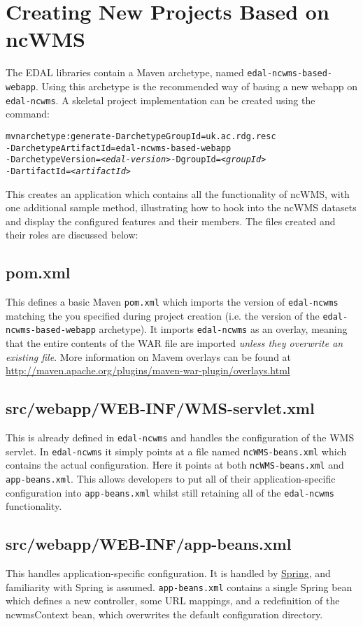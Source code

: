 \documentclass[a4paper]{article}
\begin{document}
\section{Creating New Projects Based on ncWMS}
The EDAL libraries contain a Maven archetype, named
{\tt edal-ncwms-based-webapp}.  Using this archetype is the recommended
way of basing a new webapp on {\tt edal-ncwms}.  A skeletal project
implementation can be created using the command:
\begin{alltt}
mvn archetype:generate -DarchetypeGroupId=uk.ac.rdg.resc
-DarchetypeArtifactId=edal-ncwms-based-webapp
-DarchetypeVersion=\emph{<edal-version>} -DgroupId=\emph{<groupId>}
-DartifactId=\emph{<artifactId>}
\end{alltt}
This creates an application which contains all the functionality of ncWMS, with
one additional sample method, illustrating how to hook into the ncWMS datasets
and display the configured features and their members.  The files created and
their roles are discussed below:

\subsection{pom.xml}
This defines a basic Maven {\tt pom.xml} which imports the
version of {\tt edal-ncwms} matching the {\tt <edal-version>} you specified
during project creation (i.e. the version of the {\tt edal-ncwms-based-webapp}
archetype).  It imports {\tt edal-ncwms} as an overlay, meaning that the entire
contents of the WAR file are imported \emph{unless they overwrite an existing
file}.  More information on Mavem overlays can be found at
\url{http://maven.apache.org/plugins/maven-war-plugin/overlays.html}
  
\subsection{src/webapp/WEB-INF/WMS-servlet.xml}
This is already defined in {\tt edal-ncwms} and handles the configuration of
the WMS servlet.  In {\tt edal-ncwms} it simply points at a file named
{\tt ncWMS-beans.xml} which contains the actual configuration.  Here it points
at both {\tt ncWMS-beans.xml} and {\tt app-beans.xml}.  This allows developers
to put all of their application-specific configuration into {\tt app-beans.xml}
whilst still retaining all of the {\tt edal-ncwms} functionality.

\subsection{src/webapp/WEB-INF/app-beans.xml}
This handles application-specific configuration.  It is handled by
\href{http://www.springsource.org/}{Spring}, and familiarity with Spring is
assumed.  {\tt app-beans.xml} contains a single Spring bean which defines a
new controller, some URL mappings, and a redefinition of the ncwmsContext bean,
which overwrites the default configuration directory.
\end{document}
